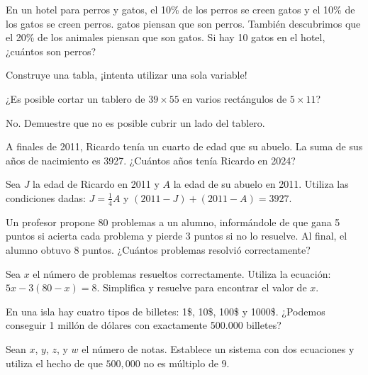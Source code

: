 \documentclass[11pt]{scrartcl}
\begin{document}
\begin{problem}
    En un hotel para perros y gatos, el 10\% de los perros se creen gatos y el 10\% de los gatos se creen perros. gatos piensan que son perros. También descubrimos que el 20\% de los animales piensan que son gatos. Si hay 10 gatos en el hotel, ¿cuántos son perros?
    \begin{hint}
        Construye una tabla, ¡intenta utilizar una sola variable!
    \end{hint}
\end{problem}

\begin{problem}
    ¿Es posible cortar un tablero de $39 \times 55$ en varios rectángulos de $5 \times 11$?
    \begin{hint}
        No. Demuestre que no es posible cubrir un lado del tablero.
    \end{hint}
\end{problem}

\begin{problem}
    A finales de 2011, Ricardo tenía un cuarto de edad que su abuelo. La suma de sus años de nacimiento es 3927. ¿Cuántos años tenía Ricardo en 2024?
    \begin{hint}
        Sea \( J \) la edad de Ricardo en 2011 y \( A \) la edad de su abuelo en 2011.
        Utiliza las condiciones dadas: \( J = \frac{1}{4}A \) y \( (2011 - J) + (2011 - A) = 3927 \).
    \end{hint}
\end{problem}

\begin{problem}
    Un profesor propone 80 problemas a un alumno, informándole de que gana 5 puntos si acierta cada problema y pierde 3 puntos si no lo resuelve. Al final, el alumno obtuvo 8 puntos. ¿Cuántos problemas resolvió correctamente?
    \begin{hint}
        Sea \(x\) el número de problemas resueltos correctamente. Utiliza la ecuación: \(5x - 3(80 - x) = 8\). Simplifica y resuelve para encontrar el valor de \(x\).
    \end{hint}
\end{problem}

\begin{problem}
    En una isla hay cuatro tipos de billetes: 1\$,
10\$, 100\$ y 1000\$. ¿Podemos conseguir 1 millón de dólares con exactamente 500.000 billetes?
    \begin{hint}
        Sean \(x\), \(y\), \(z\), y \(w\) el número de notas. Establece un sistema con dos ecuaciones y utiliza el hecho de que \(500,000\) no es múltiplo de \(9\).
    \end{hint}
\end{problem}
\end{document}
